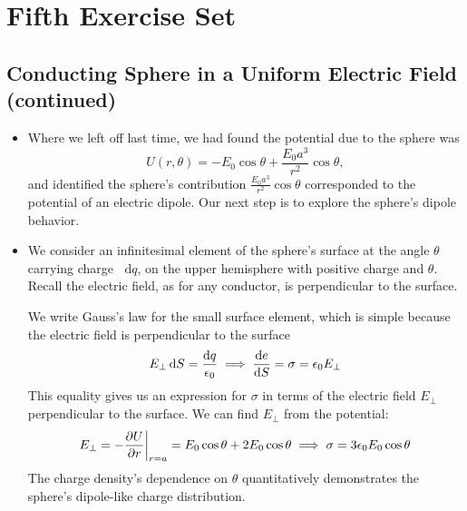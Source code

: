 \documentclass[11pt, a4paper]{article}
\newcommand{\diff}{\mathop{}\!\mathrm{d}} %
\newcommand{\ee}{\epsilon_{0}}  %
\begin{document}
\section{Fifth Exercise Set}

\subsection{Conducting Sphere in a Uniform Electric Field (continued)}
\begin{itemize}
	\item Where we left off last time, we had found the potential due to the sphere was
	\begin{equation*}
		U(r, \theta) = - E_{0} \cos \theta + \frac{E_{0}a^{3}}{r^{2}}\cos \theta,
	\end{equation*}
	and identified the sphere's contribution $ \frac{E_{0}a^{3}}{r^{2}}\cos \theta $ corresponded to the potential of an electric dipole. Our next step is to explore the sphere's dipole behavior.
	
	\item We consider an infinitesimal element of the sphere's surface at the angle $ \theta $ carrying charge $ \diff q $, on the upper hemisphere with positive charge and $ \theta $. Recall the electric field, as for any conductor, is perpendicular to the surface. 
	
	We write Gauss's law for the small surface element, which is simple because the electric field is perpendicular to the surface
	\begin{equation*}
		E_{\perp} \diff S = \frac{\diff q}{\ee} \implies \dv{e}{S} = \sigma = \ee E_{\perp}
	\end{equation*}
	This equality gives us an expression for $ \sigma $ in terms of the electric field $ E_{\perp} $ perpendicular to the surface. We can find $ E_{\perp} $ from the potential:
	\begin{equation*}
		E_{\perp} = -\pdv{U}{r}\bigg |_{r = a} = E_{0}\cos \theta + 2E_{0}\cos \theta \implies \sigma = 3\ee E_{0} \cos \theta
	\end{equation*}
	The charge density's dependence on $ \theta $ quantitatively demonstrates the sphere's dipole-like charge distribution. 
	

\end{itemize}
\end{document}
